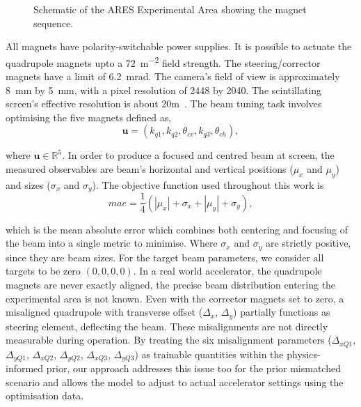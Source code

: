 \begin{figure}[ht]
\caption{Schematic of the ARES Experimental Area showing the magnet sequence.}
\label{fig:ares_lattice}
\end{figure}



All magnets have polarity-switchable power supplies. It is possible to actuate the quadrupole magnets 
upto a \SI{72}{m^{-2}} field strength. The steering/corrector magnets have a limit of \SI{6.2}{mrad}. The camera's field of view is approximately \SI{8}{mm} by \SI{5}{mm}, with a pixel resolution of 2448 by 2040. The scintillating screen's effective resolution is about \SI{20}{\mu}m~\cite{kaiser2024rl}. 
The beam tuning task involves optimising the five magnets defined as,
\begin{equation}
    \label{eq_magnets}
    \mathbf{u} = (k_{q1}, k_{q2}, \theta_{cv}, k_{q3}, \theta_{ch}),
\end{equation}

where $\mathbf{u} \in \mathbb{R}^5$. In order to produce a focused and centred beam at screen, the measured observables are beam’s 
horizontal and vertical positions ($\mu_x$ and $\mu_y$) and sizes ($\sigma_x$ and $\sigma_y$). The objective 
function used throughout this work is
\begin{equation}
    \label{eq_ares_ob}
    mae = \frac{1}{4}(|\mu_x| + \sigma_x + |\mu_y| + \sigma_y),
\end{equation}

which is the mean absolute error which combines both centering and 
focusing of the beam into a single metric to minimise. Where $\sigma_x$ and $\sigma_y$ are strictly positive, since they are beam sizes. For the target beam parameters, we consider all targets to be zero $(0,0,0,0)$. In a real world accelerator, the quadrupole magnets are never exactly aligned, 
the precise beam distribution entering the experimental area is not known. Even with the corrector magnets set to zero, 
a misaligned quadrupole with transverse offset ($\Delta_x$, $\Delta_y$) partially functions as steering element,
deflecting the beam. These misalignments are not directly measurable during operation. By treating the six misalignment parameters ($\Delta_{xQ1}$, $\Delta_{yQ1}$, $\Delta_{xQ2}$, $\Delta_{yQ2}$, $\Delta_{xQ3}$, $\Delta_{yQ3}$) 
as trainable quantities within the physics-informed prior, our approach addresses this issue too for the prior mismatched scenario
and allows the model to adjust to actual accelerator settings using the optimisation data. 




